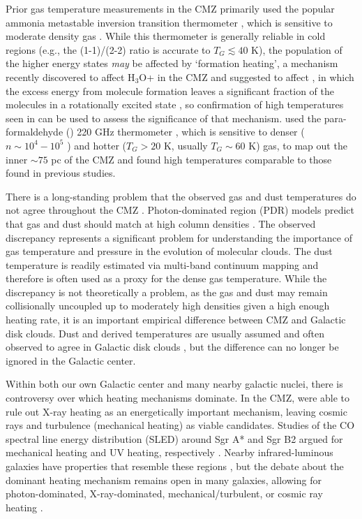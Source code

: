 Prior gas temperature measurements in the CMZ primarily used the popular
ammonia metastable inversion transition thermometer \citep[\ammonia (1,1) -
(7,7);][]{Guesten1981a,Huettemeister1993a,Ott2014a,Mauersberger1986a}, which is
sensitive to moderate density gas \citep[$n(\hh) \sim 10^3-10^4$
\percc;][]{Shirley2015a}.  While this thermometer is generally reliable in cold
regions (e.g., the (1-1)/(2-2) ratio is accurate to $T_G\lesssim40$ K), the
population of the higher energy states \emph{may} be affected by `formation
heating', a mechanism recently discovered to affect H$_3$O+ in the CMZ and
suggested to affect \ammonia, in which the excess energy from molecule
formation leaves a significant fraction of the molecules in a rotationally
excited state \citep[][]{Lis2014a}, so confirmation of high temperatures seen
in \ammonia \citep{Mills2013a} can be used to assess the significance of that
mechanism.  \citet{Ao2013a} used the para-formaldehyde (\para) 220 GHz
thermometer \citep{Mangum1993a}, which is sensitive to denser ($n\sim10^4-10^5$
\percc) and hotter ($T_G>20$ K, usually $T_G\sim60$ K) gas, to map out the
inner $\sim75$ pc of the CMZ and found high temperatures comparable to those
found in previous studies.

There is a long-standing problem that the observed gas and dust temperatures do
not agree throughout the CMZ
\citep{Guesten1981a,Molinari2011a,Ao2013a,Ott2014a}.  Photon-dominated region
(PDR) models predict that gas and dust should match at high column densities
\citep{Hollenbach1999a}.  The observed discrepancy represents a significant
problem for understanding the importance of gas temperature and pressure in the
evolution of molecular clouds.  The dust temperature is readily estimated via
multi-band continuum mapping and therefore is often used as a proxy for the
dense gas temperature.  While the discrepancy is not theoretically a problem,
as the gas and dust may remain collisionally uncoupled up to moderately high
densities given a high enough heating rate, it is an important empirical
difference between CMZ and Galactic disk clouds.  Dust and \ammonia derived
temperatures are usually assumed and often observed to agree in Galactic disk
clouds \citep{Pillai2006a,Dunham2010a,Juvela2012a,Battersby2014a}, but the
difference can no longer be ignored in the Galactic center.

Within both our own Galactic center and many nearby galactic nuclei, there is
controversy over which heating mechanisms dominate.  In the CMZ,
\citet{Ao2013a} were able to rule out X-ray heating as an energetically
important mechanism, leaving cosmic rays and turbulence (mechanical heating) as
viable candidates.  Studies of the CO spectral line energy distribution (SLED)
around Sgr A* and Sgr B2 argued for mechanical heating and UV heating,
respectively \citep{Goicoechea2013a,Etxaluze2013a}.  Nearby infrared-luminous
galaxies have properties that resemble these regions
\citep{Kamenetzky2012a,Kamenetzky2014a}, but the debate about the dominant
heating mechanism remains open in many galaxies, allowing for photon-dominated,
X-ray-dominated, mechanical/turbulent, or cosmic ray heating
\citep{Loenen2008a,Papadopoulos2011a,Meijerink2011a,Bayet2011a,Mangum2013a,Papadopoulos2013a}.

